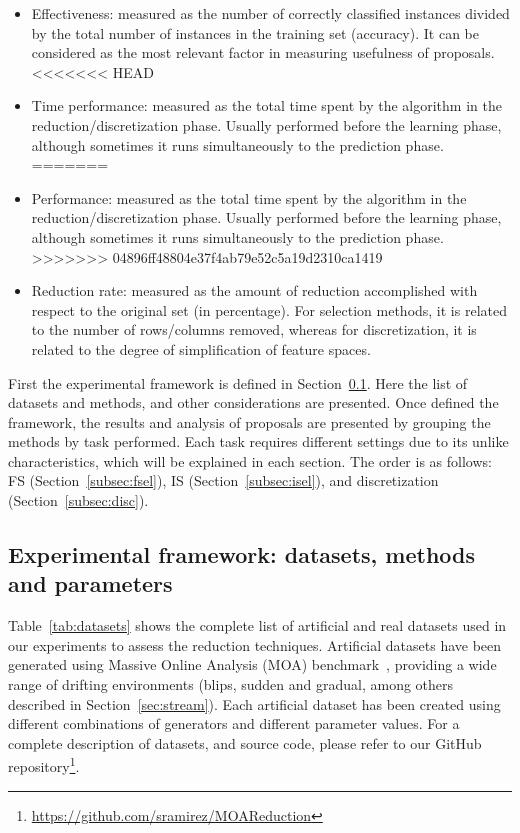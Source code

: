 \documentclass[preprint,12pt]{elsarticle}
\begin{document}
\begin{itemize}
\begin{itemize}
	\item Effectiveness: measured as the number of correctly classified instances divided by the total number of instances in the training set (accuracy). It can be considered as the most relevant factor in measuring usefulness of proposals.
<<<<<<< HEAD
	\item Time performance: measured as the total time spent by the algorithm in the reduction/discretization phase. Usually performed before the learning phase, although sometimes it runs simultaneously to the prediction phase.
=======
	\item Performance: measured as the total time spent by the algorithm in the reduction/discretization phase. Usually performed before the learning phase, although sometimes it runs simultaneously to the prediction phase.
>>>>>>> 04896ff48804e37f4ab79e52c5a19d2310ca1419
	\item Reduction rate: measured as the amount of reduction accomplished with respect to the original set (in percentage). For selection methods, it is related to the number of rows/columns removed, whereas for discretization, it is related to the degree of simplification of feature spaces.
\end{itemize} 

First the experimental framework is defined in Section~\ref{subsec:framework}. Here the list of datasets and methods, and other considerations are presented. Once defined the framework, the results and analysis of proposals are presented by grouping the methods by task performed. Each task requires different settings due to its unlike characteristics, which will be explained in each section. The order is as follows: FS (Section~\ref{subsec:fsel}), IS (Section~\ref{subsec:isel}), and discretization (Section~\ref{subsec:disc}).

\subsection{Experimental framework: datasets, methods and parameters}
\label{subsec:framework}


Table~\ref{tab:datasets} shows the complete list of artificial and real datasets used in our experiments to assess the reduction techniques. Artificial datasets have been generated using Massive Online Analysis (MOA) benchmark~\cite{bifet10}, providing a wide range of drifting environments (blips, sudden and gradual, among others described in Section~\ref{sec:stream}). Each artificial dataset has been created using different combinations of generators and different parameter values. For a complete description of datasets, and source code, please refer to our GitHub repository\footnote{\url{https://github.com/sramirez/MOAReduction}}. 


\end{itemize}
\end{document}
